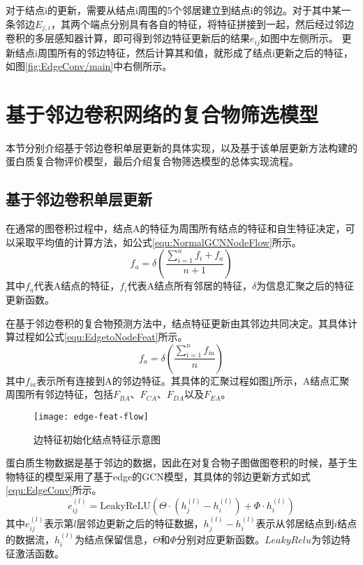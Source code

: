对于结点i的更新，需要从结点i周围的5个邻居建立到结点i的邻边。对于其中某一条邻边$E_{j,i}$，其两个端点分别具有各自的特征，将特征拼接到一起，然后经过邻边卷积的多层感知器计算，即可得到邻边特征更新后的结果$e_{ij}$如图中左侧所示。
更新结点i周围所有的邻边特征，然后计算其和值，就形成了结点i更新之后的特征，如图\ref{fig:EdgeConv/main}中右侧所示。

\section{基于邻边卷积网络的复合物筛选模型}
\label{section:EdgeConv:detail}
本节分别介绍基于邻边卷积单层更新的具体实现，以及基于该单层更新方法构建的蛋白质复合物评价模型，最后介绍复合物筛选模型的总体实现流程。

\subsection{基于邻边卷积单层更新}
\label{subsection:EdgeConv:single}

在通常的图卷积过程中，结点A的特征为周围所有结点的特征和自生特征决定，可以采取平均值的计算方法，如公式\ref{equ:NormalGCNNodeFlow}所示。
\begin{equation}
    \label{equ:NormalGCNNodeFlow}
    f_a=\delta (\frac{\sum_{i = 1}^{n}f_i+f_a}{n+1})
\end{equation}
其中$f_a$代表A结点的特征，$f_i$代表A结点所有邻居的特征，$\delta$为信息汇聚之后的特征更新函数。

在基于邻边卷积的复合物预测方法中，结点特征更新由其邻边共同决定。其具体计算过程如公式\ref{equ:EdgetoNodeFeat}所示。
\begin{equation}
    \label{equ:EdgetoNodeFeat}
    f_a=\delta (\frac{\sum_{i = 1}^{n}f_{ia}}{n})
\end{equation}
其中$f_{ia}$表示所有连接到A的邻边特征。其具体的汇聚过程如图\ref{fig:edge-feat-flow}所示，A结点汇聚周围所有邻边特征，包括$F_{BA}$、$F_{CA}$、$F_{DA}$以及$F_{EA}$。

\begin{figure}[htbp]
    \centering
    \texttt{[image: edge-feat-flow]}
    \caption{边特征初始化结点特征示意图}
    \label{fig:edge-feat-flow}
\end{figure}

蛋白质生物数据是基于邻边的数据，因此在对复合物子图做图卷积的时候，基于生物特征的模型采用了基于edge的GCN模型\cite{wang_dynamic_2019}，其具体的邻边更新方式如式\ref{equ:EdgeConv}所示。
\begin{equation}
    \label{equ:EdgeConv}
    e_{ij}^{(l)} = \mathrm{LeakyReLU}(
    \Theta \cdot (h_j^{(l)} - h_i^{(l)}) + \Phi \cdot h_i^{(l)})
\end{equation}
其中$e_{ij}^{(l)}$表示第$l$层邻边更新之后的特征数据，$h_j^{(l)} - h_i^{(l)}$表示从邻居结点到$i$结点的数据流，$h_i^{(l)}$为结点保留信息，$\Theta$和$\Phi$分别对应更新函数。$LeakyRelu$为邻边特征激活函数。

